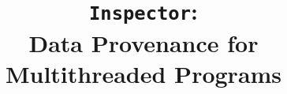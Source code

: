\documentclass{IEEEtran}
\newcommand{\projecttitle}{{\tt Inspector}\xspace}
\begin{document}

\author{
}
\title{\projecttitle:\\ Data Provenance for Multithreaded Programs}
\maketitle




%










 
\end{document}
